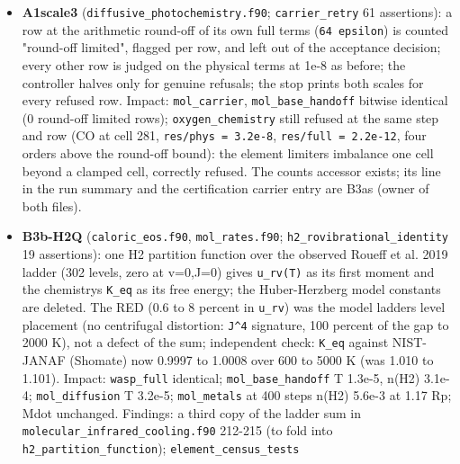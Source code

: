 \documentclass[english,a4paper]{my_memo}
\providecommand{\tightlist}{\setlength{\itemsep}{0pt}\setlength{\parskip}{0pt}}
\begin{document}
\begin{itemize}
  \begin{itemize}
  \tightlist
  \item
    RATE12 file), Venot et al. 2012 (546, A43) and 2020 (634, A78), plus
    Moses et al. 2011 (ApJ 737, 15) and Tsai et al. 2021 (ApJ 923, 264),
    which this host cannot download.
  \end{itemize}
\item
  \textbf{A1scale3} (\texttt{diffusive\_photochemistry.f90}; \texttt{carrier\_retry} 61
  assertions): a row at the arithmetic round-off of its own full terms
  (\texttt{64\ epsilon}) is counted "round-off limited", flagged per row, and left
  out of the acceptance decision; every other row is judged on the physical
  terms at 1e-8 as before; the controller halves only for genuine refusals;
  the stop prints both scales for every refused row. Impact: \texttt{mol\_carrier},
  \texttt{mol\_base\_handoff} bitwise identical (0 round-off limited rows);
  \texttt{oxygen\_chemistry} still refused at the same step and row (CO at cell 281,
  \texttt{\textbar{}res\textbar{}/phys\ =\ 3.2e-8}, \texttt{\textbar{}res\textbar{}/full\ =\ 2.2e-12}, four orders above the
  round-off bound): the element limiter\textquotesingle s imbalance one cell beyond a
  clamped cell, correctly refused. The count\textquotesingle s accessor exists; its line in
  the run summary and the certification carrier entry are B3a\textquotesingle s (owner of
  both files).
\item
  \textbf{B3b-H2Q} (\texttt{caloric\_eos.f90}, \texttt{mol\_rates.f90}; \texttt{h2\_rovibrational\_identity}
  19 assertions): one H2 partition function over the observed Roueff et al.
  2019 ladder (302 levels, zero at v=0,J=0) gives \texttt{u\_rv(T)} as its first
  moment and the chemistry\textquotesingle s \texttt{K\_eq} as its free energy; the Huber-Herzberg
  model constants are deleted. The RED (0.6 to 8 percent in \texttt{u\_rv}) was the
  model ladder\textquotesingle s level placement (no centrifugal distortion: \texttt{J\^{}4}
  signature, 100 percent of the gap to 2000 K), not a defect of the sum;
  independent check: \texttt{K\_eq} against NIST-JANAF (Shomate) now 0.9997 to
  1.0008 over 600 to 5000 K (was 1.010 to 1.101). Impact: \texttt{wasp\_full}
  identical; \texttt{mol\_base\_handoff} T 1.3e-5, n(H2) 3.1e-4; \texttt{mol\_diffusion} T
  3.2e-5; \texttt{mol\_metals} at 400 steps n(H2) 5.6e-3 at 1.17 Rp; Mdot unchanged.
  Findings: a third copy of the ladder sum in \texttt{molecular\_infrared\_cooling.f90}
  212-215 (to fold into \texttt{h2\_partition\_function}); \texttt{element\_census\_tests}

\end{itemize}
\end{document}
